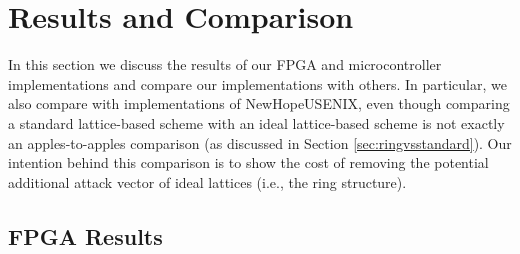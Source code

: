 \section{Results and Comparison}
In this section we discuss the results of our FPGA and microcontroller implementations and compare our implementations with others. In particular, we also compare with implementations of \textsf{NewHopeUSENIX}, even though comparing a standard lattice-based scheme with an ideal lattice-based scheme is not exactly an apples-to-apples comparison (as discussed in Section \ref{sec:ringvsstandard}). Our intention behind this comparison is to show the cost of removing the potential additional attack vector of ideal lattices (i.e., the ring structure).
\subsection{FPGA Results}


